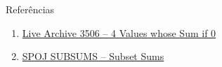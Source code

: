 \begin{frame}[fragile]{Referências}

    \begin{enumerate}
        \item \href{https://icpcarchive.ecs.baylor.edu/index.php?option=onlinejudge&page=show_problem&problem=1507}{Live Archive 3506 -- 4 Values whose Sum if 0}

        \item \href{https://www.spoj.com/problems/SUBSUMS/}{SPOJ SUBSUMS -- Subset Sums}

    \end{enumerate}

\end{frame}
